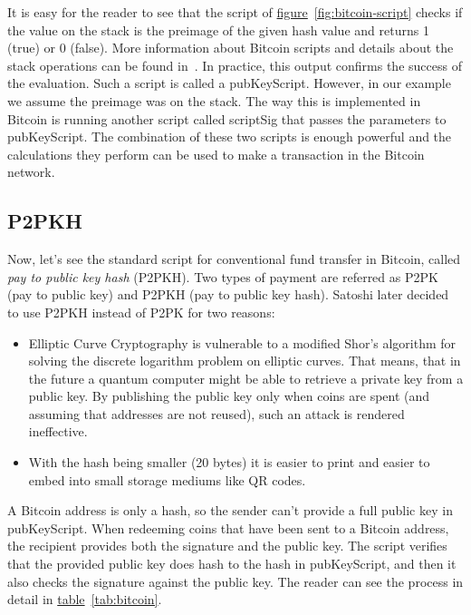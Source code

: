 It is easy for the reader to see that the script of \hyperref[fig:bitcoin-script]{figure}~\ref{fig:bitcoin-script} checks if the value on the stack is the preimage of the given hash value and returns 1 (true) or 0 (false). More information about Bitcoin scripts and details about the stack operations can be found in~\cite{wiki}. In practice, this output confirms the success of the evaluation. Such a script is called a \textsf{pubKeyScript}. However, in our example we assume the preimage was on the stack. The way this is implemented in Bitcoin is running another script called \textsf{scriptSig} that passes the parameters to \textsf{pubKeyScript}. The combination of these two scripts is enough powerful and the calculations they perform can be used to make a transaction in the Bitcoin network.

\subsection{P2PKH}
Now, let's see the standard script for conventional fund transfer in Bitcoin, called \emph{pay to public key hash} (P2PKH). Two types of payment are referred as P2PK (pay to public key) and P2PKH (pay to public key hash). Satoshi later decided to use P2PKH instead of P2PK for two reasons:

\begin{itemize}
  \item Elliptic Curve Cryptography is vulnerable to a modified Shor's algorithm for solving the discrete logarithm problem on elliptic curves. That means, that in the future a quantum computer might be able to retrieve a private key from a public key. By publishing the public key only when coins are spent (and assuming that addresses are not reused), such an attack is rendered ineffective.
  \item With the hash being smaller (20 bytes) it is easier to print and easier to embed into small storage mediums like QR codes.
\end{itemize}

A Bitcoin address is only a hash, so the sender can't provide a full public key in \textsf{pubKeyScript}. When redeeming coins that have been sent to a Bitcoin address, the recipient provides both the signature and the public key. The script verifies that the provided public key does hash to the hash in \textsf{pubKeyScript}, and then it also checks the signature against the public key. The reader can see the process in detail in \hyperref[tab:bitcoin]{table}~\ref{tab:bitcoin}.

